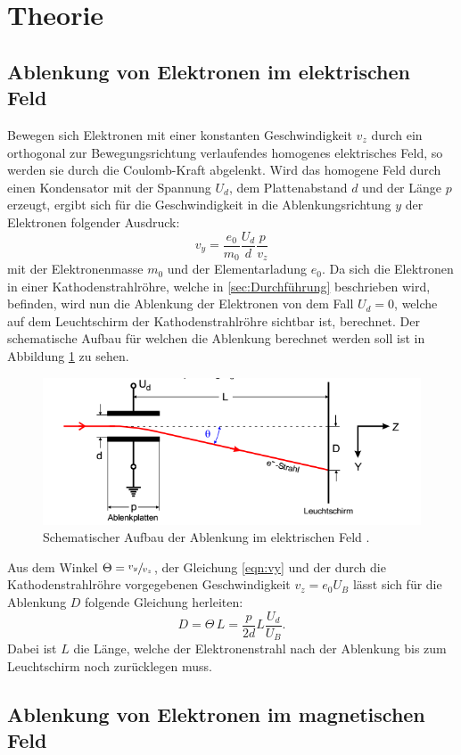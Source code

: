 \section{Theorie}
\label{sec:Theorie}
\subsection{Ablenkung von Elektronen im elektrischen Feld}
\label{sec:efeld}
Bewegen sich Elektronen mit einer konstanten Geschwindigkeit $v_z$ durch ein orthogonal zur Bewegungsrichtung verlaufendes homogenes elektrisches Feld, so werden
sie durch die Coulomb-Kraft abgelenkt. Wird das homogene Feld durch einen Kondensator mit der Spannung $U_d$, dem Plattenabstand $d$ und der Länge
$p$ erzeugt, ergibt sich für die Geschwindigkeit in die Ablenkungsrichtung $y$ der Elektronen folgender Ausdruck:
\begin{equation}
  v_y = \frac{e_0}{m_0} \frac{U_d}{d} \frac{p}{v_z}
  \label{eqn:vy}
\end{equation}
mit der Elektronenmasse $m_0$ und der Elementarladung $e_0$.
Da sich die Elektronen in einer Kathodenstrahlröhre, welche in \ref{sec:Durchführung} beschrieben wird, befinden, wird nun die Ablenkung der Elektronen von
dem Fall $U_d = 0$, welche auf dem Leuchtschirm der Kathodenstrahlröhre sichtbar ist, berechnet.
Der schematische Aufbau für welchen die Ablenkung berechnet werden soll ist in Abbildung \ref{fig:efeld} zu sehen.
\begin{figure}
  \centering
  \includegraphics{images/efeld.png}
  \caption{Schematischer Aufbau der Ablenkung im elektrischen Feld \cite{501}.}
  \label{fig:efeld}
\end{figure}
Aus dem Winkel $\Theta = \sfrac{v_y}{v_z}$, der Gleichung \eqref{eqn:vy} und der durch die Kathodenstrahlröhre vorgegebenen Geschwindigkeit $v_z = e_0 U_B$ lässt sich
für die Ablenkung $D$ folgende Gleichung herleiten:
\begin{equation}
  D = \Theta \, L =  \frac{p}{2d} L \frac{U_d}{U_B}.
  \label{eqn:Ablenkung}
\end{equation}
Dabei ist $L$ die Länge, welche der Elektronenstrahl nach der Ablenkung bis zum Leuchtschirm noch zurücklegen muss.

\subsection{Ablenkung von Elektronen im magnetischen Feld}
\label{sec:bfeld}
